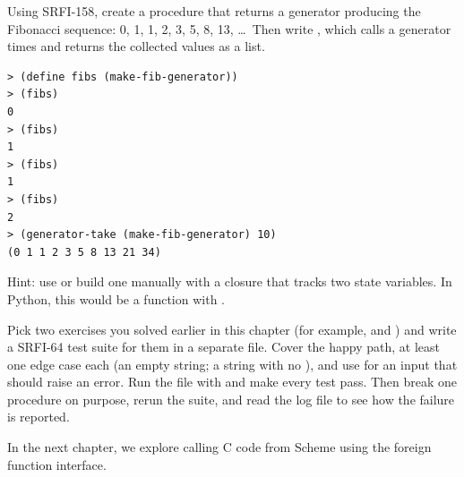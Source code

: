 \begin{exercise}
Using SRFI-158, create a procedure  that returns a generator producing the Fibonacci sequence: 0, 1, 1, 2, 3, 5, 8, 13, \ldots\ Then write , which calls a generator  times and returns the collected values as a list.

\begin{lstlisting}[style=repl]
> (define fibs (make-fib-generator))
> (fibs)
0
> (fibs)
1
> (fibs)
1
> (fibs)
2
> (generator-take (make-fib-generator) 10)
(0 1 1 2 3 5 8 13 21 34)
\end{lstlisting}

Hint: use  or build one manually with a closure that tracks two state variables. In Python, this would be a function with .
\end{exercise}

\begin{exercise}
Pick two exercises you solved earlier in this chapter (for example,  and ) and write a SRFI-64 test suite for them in a separate file. Cover the happy path, at least one edge case each (an empty string; a string with no ), and use  for an input that should raise an error. Run the file with  and make every test pass. Then break one procedure on purpose, rerun the suite, and read the log file to see how the failure is reported.
\end{exercise}

In the next chapter, we explore calling C code from Scheme using the foreign function interface.

\chapterend
